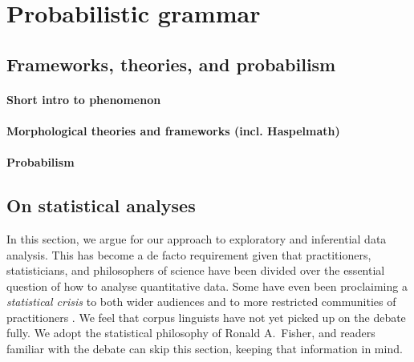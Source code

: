 \section{Probabilistic grammar}
\label{sec:probabilisticgrammar}

\subsection{Frameworks, theories, and probabilism}
\label{sec:frameworkstheoriesandprobabilism}

\paragraph{Short intro to phenomenon}

\paragraph{Morphological theories and frameworks (incl. Haspelmath)}

\paragraph{Probabilism}


\subsection{On statistical analyses}
\label{sec:onstatisticalanalyses}

In this section, we argue for our approach to exploratory and inferential data analysis.
This has become a de facto requirement given that practitioners, statisticians, and philosophers of science have been divided over the essential question of how to analyse quantitative data.
Some have even been proclaiming a \textit{statistical crisis} to both wider audiences \parencite{GelmanLoken2014} and to more restricted communities of practitioners \parencite{GelmanGeurts2017}.
We feel that corpus linguists have not yet picked up on the debate fully.
We adopt the statistical philosophy of Ronald A.\ Fisher, and readers familiar with the debate can skip this section, keeping that information in mind.

